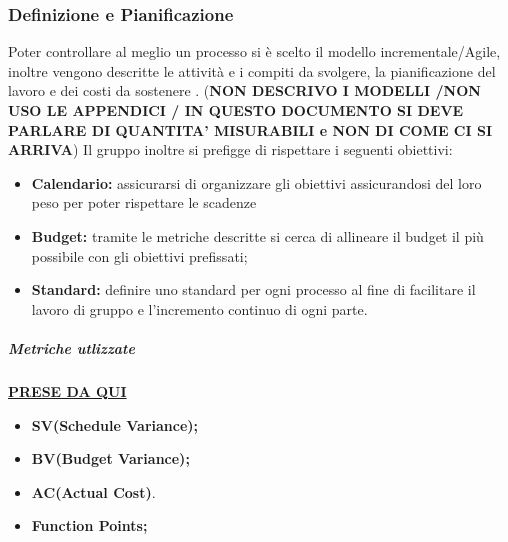 \subsubsection{Definizione e Pianificazione}
Poter controllare al meglio un processo si è scelto il modello incrementale/Agile, inoltre vengono descritte le attività e i compiti da svolgere, la pianificazione del lavoro e dei costi da sostenere . (\textbf{NON DESCRIVO I MODELLI /NON USO LE APPENDICI / IN QUESTO DOCUMENTO SI DEVE PARLARE DI QUANTITA' MISURABILI e NON DI COME CI SI ARRIVA}) Il gruppo inoltre si prefigge di rispettare i seguenti obiettivi:
\begin{itemize}
		\item{\textbf{Calendario:} assicurarsi di organizzare gli obiettivi assicurandosi del loro peso per poter rispettare le scadenze}
		\item{\textbf{Budget:} tramite le metriche descritte si cerca di allineare il budget il più possibile con gli obiettivi prefissati;}
		\item{\textbf{Standard:} definire uno standard per ogni processo al fine di facilitare il lavoro di gruppo e l'incremento continuo di ogni parte.}
\end{itemize} 
\subparagraph{Metriche utlizzate}
\href{https://it.wikipedia.org/wiki/Metriche_di_progetto}{\textbf{PRESE DA QUI}}
\begin{itemize}
	\item{\textbf{SV(Schedule Variance);}}
	\item{\textbf{BV(Budget Variance);}}
	\item{\textbf{AC(Actual Cost)}.}
	\item{\textbf{Function Points;} }
\end{itemize}
\begin{table}[!htpb]
\end{table}


